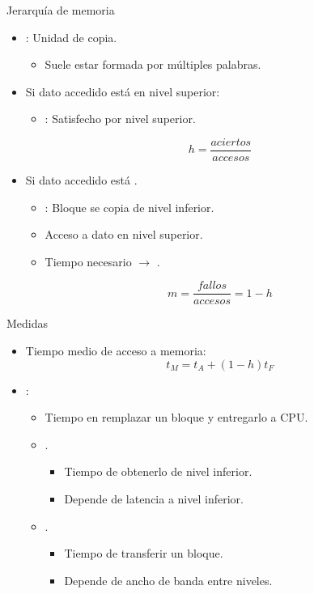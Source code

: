 \begin{frame}[t]{Jerarquía de memoria}
\begin{itemize}
  \item {}: Unidad de copia.
    \begin{itemize}
      \item Suele estar formada por múltiples palabras.
    \end{itemize}

  \item Si dato accedido está  en nivel superior:
    \begin{itemize}
      \item {}: Satisfecho por nivel superior.
    \end{itemize}
\[
h = \frac{aciertos}{accesos}
\]

  \item Si dato accedido está .
    \begin{itemize}
      \item {}: Bloque se copia de nivel inferior.
      \item Acceso a dato en nivel superior.
      \item Tiempo necesario $\rightarrow$ .
    \end{itemize}
\[
m = \frac{fallos}{accesos} = 1 - h
\]

\end{itemize}
\end{frame}

\begin{frame}[t]{Medidas}
\begin{itemize}
  \item Tiempo medio de acceso a memoria:
\[
t_M = t_A + (1-h) t_F
\]
  \item {}:
    \begin{itemize}
      \item Tiempo en remplazar un bloque y entregarlo a CPU.
      \item {}.
        \begin{itemize}
          \item Tiempo de obtenerlo de nivel inferior.
          \item Depende de latencia a nivel inferior.
        \end{itemize}
      \item {}.
        \begin{itemize}
          \item Tiempo de transferir un bloque.
          \item Depende de ancho de banda entre niveles.
        \end{itemize}
    \end{itemize}
\end{itemize}
\end{frame}

